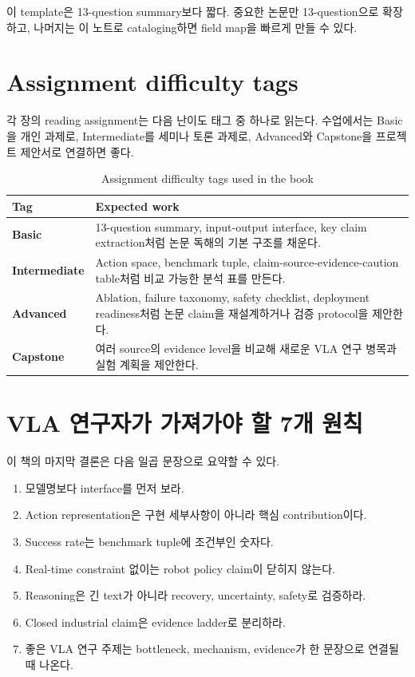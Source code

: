 이 template은 13-question summary보다 짧다. 중요한 논문만 13-question으로 확장하고, 나머지는 이 노트로 cataloging하면 field map을 빠르게 만들 수 있다.

\section{Assignment difficulty tags}

각 장의 reading assignment는 다음 난이도 태그 중 하나로 읽는다. 수업에서는 Basic을 개인 과제로, Intermediate를 세미나 토론 과제로, Advanced와 Capstone을 프로젝트 제안서로 연결하면 좋다.

\begin{table}[t]
  \centering
  \caption{Assignment difficulty tags used in the book}
  \label{tab:assignment_difficulty_tags}
  \begin{tabularx}{\textwidth}{>{\bfseries}p{28mm}X}
    \toprule
    Tag & Expected work \\
    \midrule
    Basic & 13-question summary, input-output interface, key claim extraction처럼 논문 독해의 기본 구조를 채운다. \\
    Intermediate & Action space, benchmark tuple, claim-source-evidence-caution table처럼 비교 가능한 분석 표를 만든다. \\
    Advanced & Ablation, failure taxonomy, safety checklist, deployment readiness처럼 논문 claim을 재설계하거나 검증 protocol을 제안한다. \\
    Capstone & 여러 source의 evidence level을 비교해 새로운 VLA 연구 병목과 실험 계획을 제안한다. \\
    \bottomrule
  \end{tabularx}
\end{table}

\section{VLA 연구자가 가져가야 할 7개 원칙}

이 책의 마지막 결론은 다음 일곱 문장으로 요약할 수 있다.

\begin{enumerate}
  \item 모델명보다 interface를 먼저 보라.
  \item Action representation은 구현 세부사항이 아니라 핵심 contribution이다.
  \item Success rate는 benchmark tuple에 조건부인 숫자다.
  \item Real-time constraint 없이는 robot policy claim이 닫히지 않는다.
  \item Reasoning은 긴 text가 아니라 recovery, uncertainty, safety로 검증하라.
  \item Closed industrial claim은 evidence ladder로 분리하라.
  \item 좋은 VLA 연구 주제는 bottleneck, mechanism, evidence가 한 문장으로 연결될 때 나온다.
\end{enumerate}

